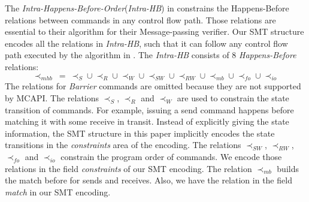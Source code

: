 The \textit{Intra-Happens-Before-Order}(\textit{Intra-HB}) in \cite{sarvani:fm09} constrains the Happens-Before relations between commands in any control flow path. Those relations are essential to their algorithm for their Message-passing verifier. Our SMT structure encodes all the relations in \textit{Intra-HB}, such that it can follow any control flow path executed by the algorithm in \cite{sarvani:fm09}. The \textit{Intra-HB} consists of 8 \textit{Happens-Before} relations:
\[\prec_{mhb}\ =\ \prec_S \cup \prec_R \cup \prec_W \cup \prec_{SW} \cup \prec_{RW} \cup \prec_{mb} \cup \prec_{fo} \cup \prec_{io} \]
The relations for \textit{Barrier} commands are omitted because they are not supported by MCAPI. The relations $\prec_S$, $\prec_R$ and $\prec_W$ are used to constrain the state transition of commands. For example, issuing a send command happens before matching it with some receive in transit. Instead of explicitly giving the state information, the SMT structure in this paper implicitly encodes the state transitions in the \textit{constraints} area of the encoding. The relations $\prec_{SW}$, $\prec_{RW}$, $\prec_{fo}$ and $\prec_{io}$ constrain the program order of commands. We encode those relations in the field \textit{constraints} of our SMT encoding. The relation $\prec_{mb}$ builds the match before for sends and receives. Also, we have the relation in the field \textit{match} in our SMT encoding.

